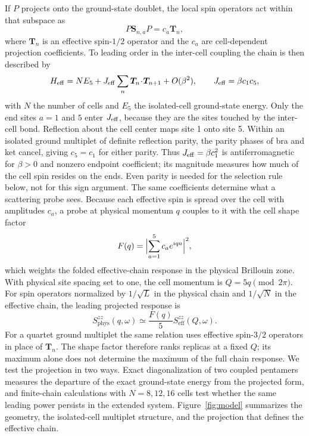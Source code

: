 If $P$ projects onto the ground-state doublet, the local spin operators act
within that subspace as
\begin{equation}
P\bm S_{n,a}P=c_a\bm T_n,
\label{eq:projection}
\end{equation}
where $\bm T_n$ is an effective spin-$1/2$ operator and the $c_a$ are
cell-dependent projection coefficients.
To leading order in the inter-cell coupling the chain is then described by
\begin{equation}
H_{\mathrm{eff}}=NE_5+J_{\mathrm{eff}}\sum_n\bm T_n\!\cdot\!\bm T_{n+1}+O(\beta^2),
\qquad J_{\mathrm{eff}}=\beta c_1c_5,
\label{eq:effective}
\end{equation}
with $N$ the number of cells and $E_5$ the isolated-cell ground-state energy.
Only the end sites $a=1$ and $5$ enter $J_{\mathrm{eff}}$, because they are the sites touched
by the inter-cell bond.
Reflection about the cell center maps site 1 onto site 5.
Within an isolated ground multiplet of definite reflection parity, the parity
phases of bra and ket cancel, giving $c_5=c_1$ for either parity.
Thus $J_{\mathrm{eff}}=\beta c_1^2$ is antiferromagnetic for $\beta>0$ and nonzero endpoint
coefficient; its magnitude measures how much of the cell spin resides on the ends.
Even parity is needed for the selection rule below, not for this sign argument.
The same coefficients determine what a scattering probe sees.
Because each effective spin is spread over the cell with amplitudes $c_a$, a
probe at physical momentum $q$ couples to it with the cell shape factor
\begin{equation}
F(q)=\Bigl|\sum_{a=1}^{5}c_a e^{iqa}\Bigr|^2,
\label{eq:shape}
\end{equation}
which weights the folded effective-chain response in the physical Brillouin zone.
With physical site spacing set to one, the cell momentum is
$Q=5q\pmod{2\pi}$.
For spin operators normalized by $1/\sqrt{L}$ in the physical chain and
$1/\sqrt{N}$ in the effective chain, the leading projected response is
\begin{equation}
S^{zz}_{\mathrm{phys}}(q,\omega)\simeq
\frac{F(q)}{5}S^{zz}_{\mathrm{eff}}(Q,\omega).
\label{eq:folded-response}
\end{equation}
For a quartet ground multiplet the same relation uses effective spin-$3/2$
operators in place of $\bm T_n$.
The shape factor therefore ranks replicas at a fixed $Q$; its maximum alone
does not determine the maximum of the full chain response.
We test the projection in two ways.
Exact diagonalization of two coupled pentamers measures the departure of the
exact ground-state energy from the projected form, and finite-chain calculations
with $N=8,12,16$ cells test whether the same leading power persists in the
extended system.
Figure~\ref{fig:model} summarizes the geometry, the isolated-cell multiplet
structure, and the projection that defines the effective chain.

